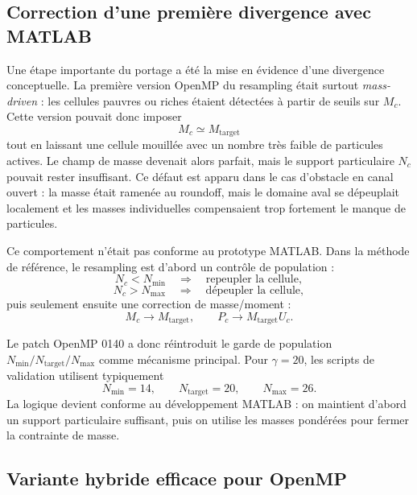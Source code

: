 \documentclass[11pt,a4paper]{article}
\begin{document}
\subsection{Correction d'une première divergence avec MATLAB}

Une étape importante du portage a été la mise en évidence d'une divergence conceptuelle. La première version OpenMP du resampling était surtout \emph{mass-driven} : les cellules pauvres ou riches étaient détectées à partir de seuils sur $M_c$. Cette version pouvait donc imposer
\begin{equation}
  M_c \simeq M_{\mathrm{target}}
\end{equation}
tout en laissant une cellule mouillée avec un nombre très faible de particules actives. Le champ de masse devenait alors parfait, mais le support particulaire $N_c$ pouvait rester insuffisant. Ce défaut est apparu dans le cas d'obstacle en canal ouvert : la masse était ramenée au roundoff, mais le domaine aval se dépeuplait localement et les masses individuelles compensaient trop fortement le manque de particules.

Ce comportement n'était pas conforme au prototype MATLAB. Dans la méthode de référence, le resampling est d'abord un contrôle de population :
\begin{equation}
  N_c < N_{\min} \quad\Longrightarrow\quad \text{repeupler la cellule},
\end{equation}
\begin{equation}
  N_c > N_{\max} \quad\Longrightarrow\quad \text{dépeupler la cellule},
\end{equation}
puis seulement ensuite une correction de masse/moment :
\begin{equation}
  M_c \rightarrow M_{\mathrm{target}},\qquad
  P_c \rightarrow M_{\mathrm{target}}U_c.
\end{equation}

Le patch OpenMP 0140 a donc réintroduit le garde de population $N_{\min}/N_{\mathrm{target}}/N_{\max}$ comme mécanisme principal. Pour $\gamma=20$, les scripts de validation utilisent typiquement
\begin{equation}
  N_{\min}=14,\qquad N_{\mathrm{target}}=20,\qquad N_{\max}=26.
\end{equation}
La logique devient conforme au développement MATLAB : on maintient d'abord un support particulaire suffisant, puis on utilise les masses pondérées pour fermer la contrainte de masse.

\subsection{Variante hybride efficace pour OpenMP}
\end{document}
